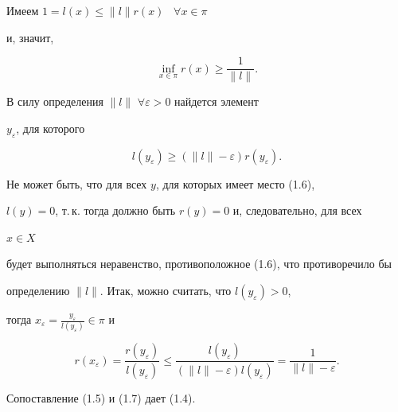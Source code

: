 \begin{pf} 


Имеем $1=l(x)\le\|l\|r(x)$ \, $\forall x\in\pi$ 


и, значит, 


\begin{equation} 


\inf_{x\in \pi}r(x)\ge\frac{1}{\|l\|}. 


\end{equation} 


В силу определения $\|l\|$\; $\forall\varepsilon>0$ найдется элемент 


$y_\varepsilon$, для которого 


\begin{equation} 


l(y_\varepsilon)\ge(\|l\|-\varepsilon) 


r(y_\varepsilon). 


\end{equation} 


Не может быть, что для всех $y$, для которых имеет место (1.6),


$l(y)=0$, т.\,к. тогда должно быть $r(y)=0$ и, следовательно, для всех 


$x\in X$ 


будет выполняться неравенство, противоположное (1.6), что противоречило бы 


определению $\|l\|$. Итак, можно считать, что $l(y_\varepsilon)>0$,


тогда $x_\varepsilon=\frac{y_\varepsilon}{l(y_\varepsilon)}\in\pi$ и 


\begin{equation} 


r(x_\varepsilon)=\frac{r(y_\varepsilon)}{l(y_\varepsilon)}\le 


\frac{l(y_\varepsilon)}{(\|l\|-\varepsilon)l(y_\varepsilon)}= 


\frac{1}{\|l\|-\varepsilon}. 


\end{equation} 


Сопоставление (1.5) и (1.7) дает (1.4). 


\end{pf} 


 


